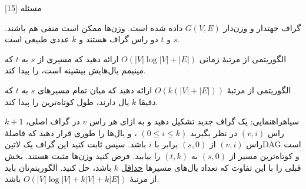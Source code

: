‌مسئله [15]


% 
%
%
% 
گراف جهتدار و وزن‌دار
$G(V,E)$
داده شده است. وزن‌ها ممکن است منفی هم باشند. $s$ و $t$ دو راس گراف هستند و $k$ عددی طبیعی است.


الگوریتمی از مرتبۀ زمانی 
$O(|V|\log |V| + |E|)$
ارائه دهید که مسیری از $s$ به $t$ که مینیمم یال‌هایش بیشینه است، را پیدا کند.

الگوریتمی از  مرتبۀ 
$O(k(|V| + |E|))$
ارائه دهید که میان تمام مسیرهای $s$ به $t$ که دقیقا $k$ یال دارند، طول کوتاه‌ترین را پیدا کند.

‌سیاه{راهنمایی:}
یک گراف جدید تشکیل دهید و به ازای هر راس $v$ در گراف اصلی، 
$k + 1$
راس $(v,i)$ در نظر بگیرید
$(0 \le i \le k)$
،
و یال‌ها را طوری قرار دهید که فاصلۀ راس
$(v,i)$
از $(s,0)$ برابر با $i$ باشد. سپس ثابت کنید این گراف یک ‌لاتین{DAG} است و کوتاه‌ترین مسیر از $(s,0)$ به $(t,k)$ را بیابید.
فرض کنید وزن‌ها مثبت هستند.
بخش قبلی را با این تفاوت که تعداد یال‌های مسیرها \underline{حداقل} $k$ باشد، حل کنید. الگوریتم‌تان باید از مرتبۀ 
$O(|V|\log |V| + k|V| + k|E|)$
باشد.

